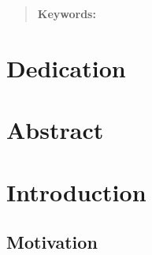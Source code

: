 \documentclass[12pt]{report} %
\begin{document}
\renewcommand\abstractname{\large\uppercase{Summary}}
\begin{abstract}
\thispagestyle{plain}
\setcounter{page}{3}
	
	
	\textbf{Keywords:}
	
	\vfill
\end{abstract}
	\newpage
	\thispagestyle{empty}
	\mbox{}


\chapter*{Dedication}

\setcounter{page}{5}
	
		
	\vfill
	
	\newpage
	\thispagestyle{empty}
	\mbox{}
	
\chapter*{Abstract}

\setcounter{page}{5}
	
		
	\vfill
	
	\newpage
	\thispagestyle{empty}
	\mbox{}
	


\tableofcontents
\thispagestyle{fancy}

\newpage
\thispagestyle{empty}
\mbox{}

\listoffigures
\thispagestyle{fancy}

\newpage
\thispagestyle{empty}
\mbox{}

\listoftables
\thispagestyle{fancy}

\newpage %
\thispagestyle{empty}
\mbox{}


\clearpage
{}

\chapter{Introduction}
\section{Motivation}
\end{document}
